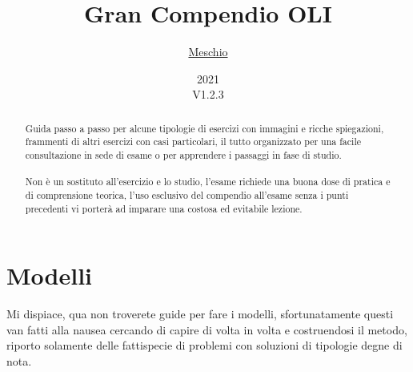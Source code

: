 \documentclass{article}
\title{Gran Compendio OLI}
\author{\href{https://github.com/meschio94/Gran-Compendio-OLI}{Meschio}}
\date{2021\\V1.2.3}
\begin{document}
\maketitle

\begin{abstract}
Guida passo a passo per alcune tipologie di esercizi con immagini e ricche spiegazioni, frammenti di altri esercizi con casi particolari, il tutto organizzato per una facile consultazione in sede di esame o per apprendere i passaggi in fase di studio.\\
\\
Non è un sostituto all'esercizio e lo studio, l'esame richiede una buona dose di pratica e di comprensione teorica, l'uso esclusivo del compendio all'esame senza i punti precedenti vi porterà ad imparare una costosa ed evitabile lezione.
\end{abstract}

\tableofcontents

\newpage
\section{Modelli}
Mi dispiace, qua non troverete guide per fare i modelli, sfortunatamente questi van fatti alla nausea cercando di capire di volta in volta e costruendosi il metodo, riporto solamente delle fattispecie di problemi con soluzioni di tipologie degne di nota.
\end{document}
